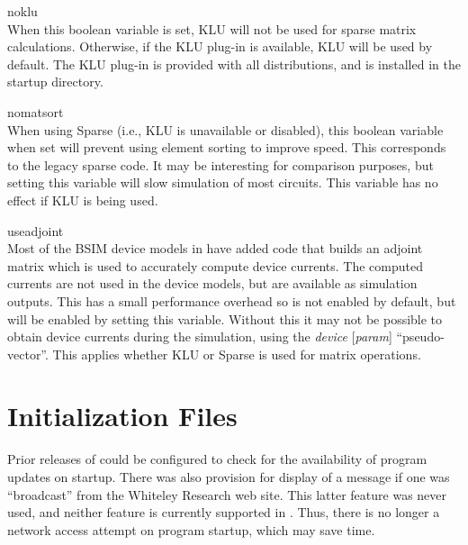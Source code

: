 \begin{description}
\item{\vt noklu}\\
When this boolean variable is set, KLU will not be used for sparse
matrix calculations.  Otherwise, if the KLU plug-in is available, KLU
will be used by default.  The KLU plug-in is provided with all
{\WRspice} distributions, and is installed in the startup directory.

\item{\vt nomatsort}\\
When using Sparse (i.e., KLU is unavailable or disabled), this
boolean variable when set will prevent using element sorting to
improve speed.  This corresponds to the legacy {\WRspice}
sparse code.  It may be interesting for comparison purposes, but
setting this variable will slow simulation of most circuits.
This variable has no effect if KLU is being used.

\item{\vt useadjoint}\\
Most of the BSIM device models in {\WRspice} have added code that
builds an adjoint matrix which is used to accurately compute device
currents.  The computed currents are not used in the device models,
but are available as simulation outputs.  This has a small performance
overhead so is not enabled by default, but will be enabled by setting
this variable.  Without this it may not be possible to obtain device
currents during the simulation, using the {\vt \@}{\it device\/}{\vt
[}{\it param\/}{\vt ]} ``pseudo-vector''.  This applies whether KLU or
Sparse is used for matrix operations.
\end{description}


\section{Initialization Files}
\label{startup}


Prior releases of {\WRspice} could be configured to check for the
availability of program updates on startup.  There was also provision
for display of a message if one was ``broadcast'' from the Whiteley
Research web site.  This latter feature was never used, and neither
feature is currently supported in {\WRspice}.  Thus, there is no
longer a network access attempt on program startup, which may save
time.

